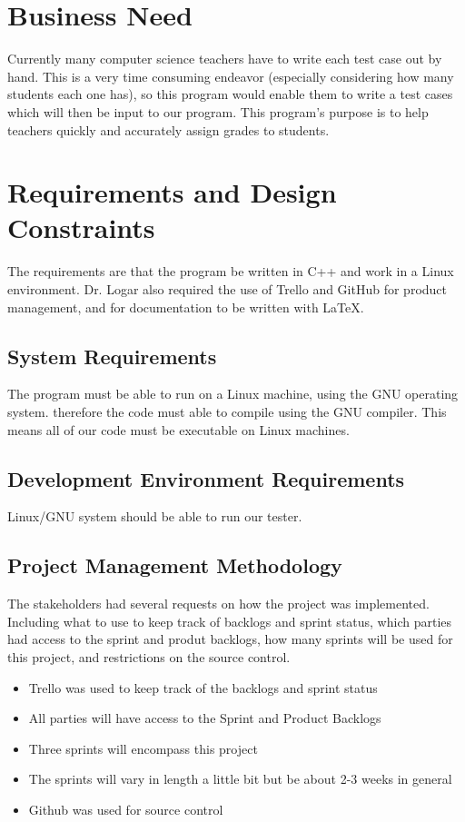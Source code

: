 \section{Business Need}
Currently many computer science teachers have to write each test case out by hand.   
This is a very time consuming endeavor (especially considering how many students each
one has), so this program would enable them to write a test cases which will then be input
to our program. This program's purpose is to help teachers quickly and accurately assign grades to students.

\section{Requirements and Design Constraints}
The requirements are that the program be written in C++ and work in a Linux environment. Dr. Logar also required the use of Trello and GitHub for product management, and for documentation to be written with \LaTeX.


\subsection{System  Requirements}
The program must be able to run on a Linux machine, using the GNU operating system.   
therefore the code must able to compile using the GNU compiler.   This means all of our
code must be executable on Linux machines.

\subsection{Development Environment Requirements}
Linux/GNU system should be able to run our tester. 


\subsection{Project  Management Methodology}
The stakeholders had several requests on how the project was implemented. Including 
what to use to keep track of backlogs and sprint status, which parties had access to the
sprint and produt backlogs, how many sprints will be used for this project, and restrictions
on the source control.
 
\begin{itemize}
\item Trello was used to keep track of the backlogs and sprint status
\item All parties will have access to the Sprint and Product Backlogs
\item Three sprints will encompass this project
\item The sprints will vary in length a little bit but be about 2-3 weeks in general
\item Github was used for source control
\end{itemize}

